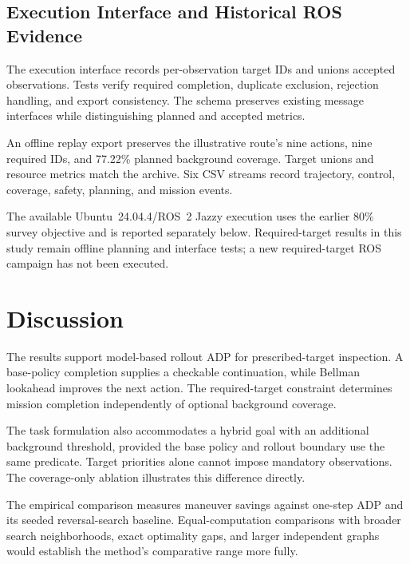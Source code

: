 \subsection{Execution Interface and Historical ROS Evidence}
\label{sec:ros-verification-protocol}

The execution interface records per-observation target IDs and unions accepted observations. Tests verify required completion, duplicate exclusion, rejection handling, and export consistency. The schema preserves existing message interfaces while distinguishing planned and accepted metrics.

An offline replay export preserves the illustrative route's nine actions, nine required IDs, and 77.22\% planned background coverage. Target unions and resource metrics match the archive. Six CSV streams record trajectory, control, coverage, safety, planning, and mission events.

The available Ubuntu~24.04.4/ROS~2 Jazzy execution uses the earlier 80\% survey objective and is reported separately below. Required-target results in this study remain offline planning and interface tests; a new required-target ROS campaign has not been executed.

\ifincludeROSVerificationResults
  
\fi

\section{Discussion}
\label{sec:discussion}

The results support model-based rollout ADP for prescribed-target inspection. A base-policy completion supplies a checkable continuation, while Bellman lookahead improves the next action. The required-target constraint determines mission completion independently of optional background coverage.

The task formulation also accommodates a hybrid goal with an additional background threshold, provided the base policy and rollout boundary use the same predicate. Target priorities alone cannot impose mandatory observations. The coverage-only ablation illustrates this difference directly.

The empirical comparison measures maneuver savings against one-step ADP and its seeded reversal-search baseline. Equal-computation comparisons with broader search neighborhoods, exact optimality gaps, and larger independent graphs would establish the method's comparative range more fully.

